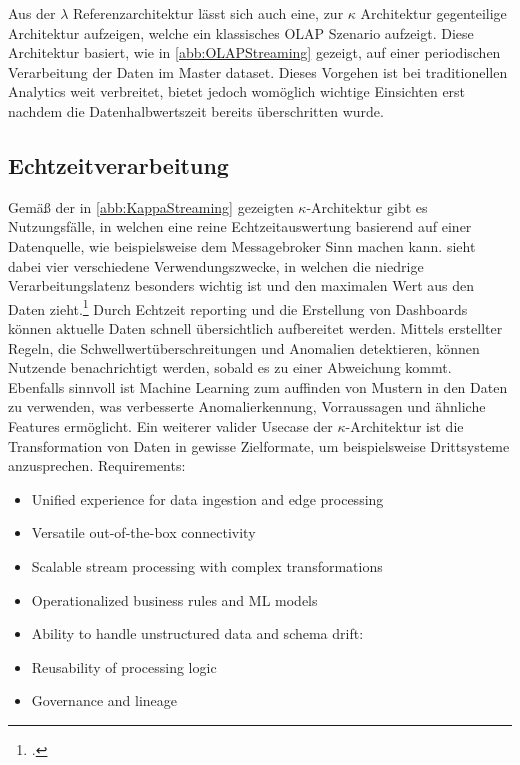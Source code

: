 Aus der $\lambda$ Referenzarchitektur lässt sich auch eine, zur $\kappa$ Architektur gegenteilige Architektur aufzeigen, welche ein klassisches \ac{OLAP} Szenario aufzeigt.  Diese Architektur basiert, wie in \autoref{abb:OLAPStreaming} gezeigt, auf einer periodischen Verarbeitung der Daten im Master dataset. Dieses Vorgehen ist bei traditionellen Analytics weit verbreitet, bietet jedoch womöglich wichtige Einsichten erst nachdem die Datenhalbwertszeit bereits überschritten wurde.



\subsection{Echtzeitverarbeitung}
Gemäß der in \autoref{abb:KappaStreaming} gezeigten $\kappa$-Architektur gibt es Nutzungsfälle, in welchen eine reine Echtzeitauswertung basierend auf einer Datenquelle, wie beispielsweise dem Messagebroker Sinn machen kann. \citeauthor{Belur.2020} sieht dabei vier verschiedene Verwendungszwecke, in welchen die niedrige Verarbeitungslatenz besonders wichtig ist und den maximalen Wert aus den Daten zieht.\footcite[Vgl. auch im Folgenden][]{Belur.2020} Durch Echtzeit reporting und die Erstellung von Dashboards können aktuelle Daten schnell übersichtlich aufbereitet werden. Mittels erstellter Regeln, die Schwellwertüberschreitungen und Anomalien detektieren, können Nutzende benachrichtigt werden, sobald es zu einer Abweichung kommt. Ebenfalls sinnvoll ist Machine Learning zum auffinden von Mustern in den Daten zu verwenden, was verbesserte Anomalierkennung, Vorraussagen und ähnliche Features ermöglicht. Ein weiterer valider Usecase der $\kappa$-Architektur ist die Transformation von Daten in gewisse Zielformate, um beispielsweise Drittsysteme anzusprechen.
Requirements:
\begin{itemize}
\item Unified experience for data ingestion and edge processing
\item Versatile out-of-the-box connectivity
\item Scalable stream processing with complex transformations
\item Operationalized business rules and ML models
\item Ability to handle unstructured data and schema drift:
\item Reusability of processing logic
\item Governance and lineage
\end{itemize}


